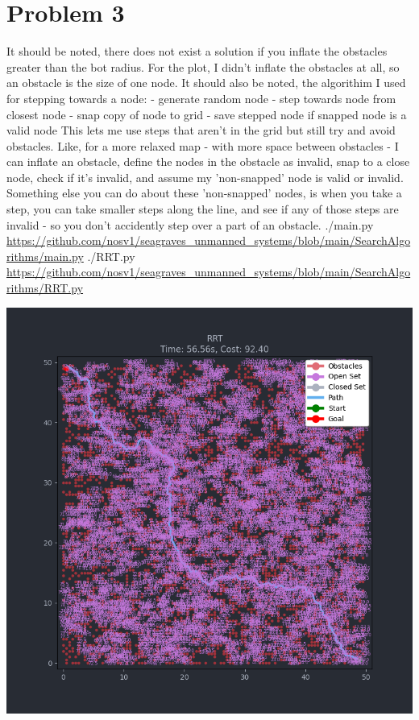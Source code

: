 \documentclass{article}
\begin{document}
        \section*{Problem 3}
            \begin{minipage}{\linewidth}
                \raggedright
                It should be noted, there does not exist a solution if you inflate the obstacles greater than the bot radius. For the plot, I didn't inflate the obstacles at all, so an obstacle is the size of one node. \break
                \break
                It should also be noted, the algorithim I used for stepping towards a node: \break
                \break
                - generate random node \break
                - step towards node from closest node \break
                - snap copy of node to grid \break
                - save stepped node if snapped node is a valid node \break
                \break
                This lets me use steps that aren't in the grid but still try and avoid obstacles. Like, for a more relaxed map - with more space between obstacles - I can inflate an obstacle, define the nodes in the obstacle as invalid, snap to a close node, check if it's invalid, and assume my 'non-snapped' node is valid or invalid.\break
                \break
                Something else you can do about these 'non-snapped' nodes, is when you take a step, you can take smaller steps along the line, and see if any of those steps are invalid - so you don't accidently step over a part of an obstacle. \break
                \break
                ./main.py \break
                \url{https://github.com/nosv1/seagraves_unmanned_systems/blob/main/SearchAlgorithms/main.py} \break
                ./RRT.py \break
                \url{https://github.com/nosv1/seagraves_unmanned_systems/blob/main/SearchAlgorithms/RRT.py}
                \begin{center}
                    \includegraphics[width=\linewidth]{HW3P3 RRT.png}
                \end{center}
            \end{minipage}
\end{document}
